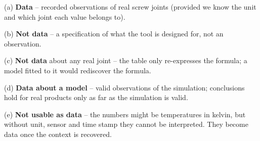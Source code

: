 \documentclass[
  letterpaper,
  DIV=11,
  numbers=noendperiod]{scrreprt}
\begin{document}
\begin{tcolorbox}[enhanced jigsaw, left=2mm, title=\textcolor{quarto-callout-caution-color}{\faFire}\hspace{0.5em}{Solution to Exercise 5}, opacityback=0, breakable, rightrule=.15mm, arc=.35mm, toptitle=1mm, colbacktitle=quarto-callout-caution-color!10!white, opacitybacktitle=0.6, coltitle=black, colframe=quarto-callout-caution-color-frame, bottomrule=.15mm, leftrule=.75mm, bottomtitle=1mm, titlerule=0mm, toprule=.15mm, colback=white]

(a) \textbf{Data} -- recorded observations of real screw joints
(provided we know the unit and which joint each value belongs to).

(b) \textbf{Not data} -- a specification of what the tool is designed
for, not an observation.

(c) \textbf{Not data} about any real joint -- the table only
re-expresses the formula; a model fitted to it would rediscover the
formula.

(d) \textbf{Data about a model} -- valid observations of the simulation;
conclusions hold for real products only as far as the simulation is
valid.

(e) \textbf{Not usable as data} -- the numbers might be temperatures in
kelvin, but without unit, sensor and time stamp they cannot be
interpreted. They become data once the context is recovered.

\end{tcolorbox}
\end{document}
